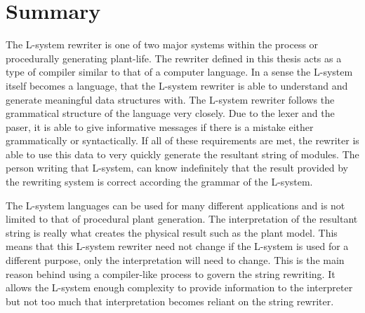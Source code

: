 \newpage
\section{Summary}

The L-system rewriter is one of two major systems within the process or procedurally generating plant-life. The rewriter defined in this thesis acts as a type of compiler similar to that of a computer language. In a sense the L-system itself becomes a language, that the L-system rewriter is able to understand and generate meaningful data structures with. The L-system rewriter follows the grammatical structure of the language very closely. Due to the lexer and the paser, it is able to give informative messages if there is a mistake either grammatically or syntactically. If all of these requirements are met, the rewriter is able to use this data to very quickly generate the resultant string of modules. The person writing that L-system, can know indefinitely that the result provided by the rewriting system is correct according the grammar of the L-system.

The L-system languages can be used for many different applications and is not limited to that of procedural plant generation. The interpretation of the resultant string is really what creates the physical result such as the plant model. This means that this L-system rewriter need not change if the L-system is used for a different purpose, only the interpretation will need to change. This is the main reason behind using a compiler-like process to govern the string rewriting. It allows the L-system enough complexity to provide information to the interpreter but not too much that interpretation becomes reliant on the string rewriter.  